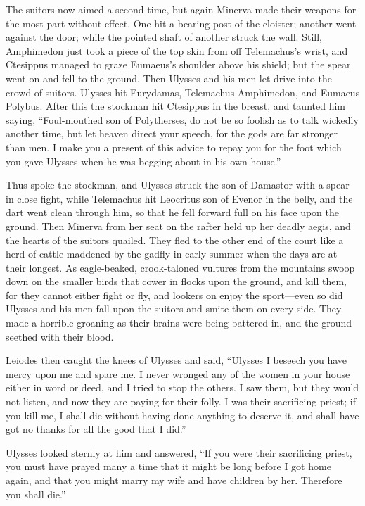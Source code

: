 The suitors now aimed a second time, but again Minerva made their weapons for
the most part without effect. One hit a bearing-post of the cloister; another
went against the door; while the pointed shaft of another struck the wall.
Still, Amphimedon just took a piece of the top skin from off Telemachus’s
wrist, and Ctesippus managed to graze Eumaeus’s shoulder above his shield; but
the spear went on and fell to the ground. Then Ulysses and his men let drive
into the crowd of suitors. Ulysses hit Eurydamas, Telemachus Amphimedon, and
Eumaeus Polybus. After this the stockman hit Ctesippus in the breast, and
taunted him saying, “Foul-mouthed son of Polytherses, do not be so foolish as
to talk wickedly another time, but let heaven direct your speech, for the gods
are far stronger than men. I make you a present of this advice to repay you for
the foot which you gave Ulysses when he was begging about in his own house.”

Thus spoke the stockman, and Ulysses struck the son of Damastor with a spear in
close fight, while Telemachus hit Leocritus son of Evenor in the belly, and the
dart went clean through him, so that he fell forward full on his face upon the
ground. Then Minerva from her seat on the rafter held up her deadly aegis, and
the hearts of the suitors quailed. They fled to the other end of the court like
a herd of cattle maddened by the gadfly in early summer when the days are at
their longest. As eagle-beaked, crook-taloned vultures from the mountains swoop
down on the smaller birds that cower in flocks upon the ground, and kill them,
for they cannot either fight or fly, and lookers on enjoy the sport—even so did
Ulysses and his men fall upon the suitors and smite them on every side. They
made a horrible groaning as their brains were being battered in, and the ground
seethed with their blood.

Leiodes then caught the knees of Ulysses and said, “Ulysses I beseech you have
mercy upon me and spare me. I never wronged any of the women in your house
either in word or deed, and I tried to stop the others. I saw them, but they
would not listen, and now they are paying for their folly. I was their
sacrificing priest; if you kill me, I shall die without having done anything to
deserve it, and shall have got no thanks for all the good that I did.”

Ulysses looked sternly at him and answered, “If you were their sacrificing
priest, you must have prayed many a time that it might be long before I got
home again, and that you might marry my wife and have children by her.
Therefore you shall die.”

